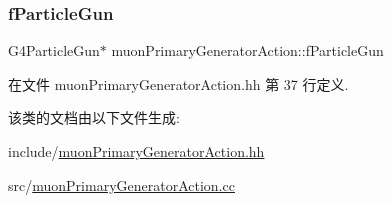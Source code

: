\subsubsection{\texorpdfstring{f\+Particle\+Gun}{fParticleGun}}
{\footnotesize\ttfamily G4\+Particle\+Gun$\ast$ muon\+Primary\+Generator\+Action\+::f\+Particle\+Gun\hspace{0.3cm}{\ttfamily [private]}}



在文件 muon\+Primary\+Generator\+Action.\+hh 第 37 行定义.



该类的文档由以下文件生成\+:\begin{DoxyCompactItemize}
\item 
include/\hyperlink{muonPrimaryGeneratorAction_8hh}{muon\+Primary\+Generator\+Action.\+hh}\item 
src/\hyperlink{muonPrimaryGeneratorAction_8cc}{muon\+Primary\+Generator\+Action.\+cc}\end{DoxyCompactItemize}
